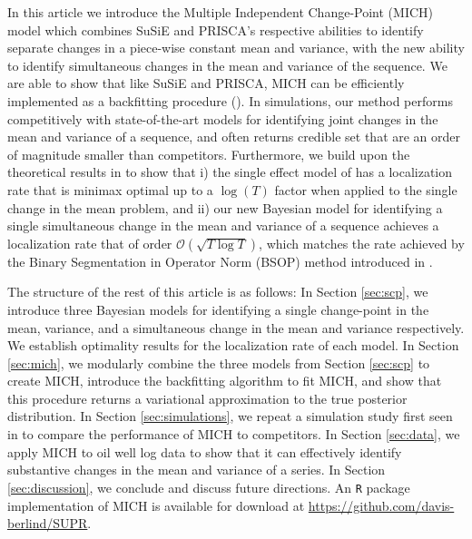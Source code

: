 In this article we introduce the Multiple Independent Change-Point (MICH) model which combines SuSiE and PRISCA's respective abilities to identify separate changes in a piece-wise constant mean and variance, with the new ability to identify simultaneous changes in the mean and variance of the sequence. We are able to show that like SuSiE and PRISCA, MICH can be efficiently implemented as a backfitting procedure (\citealp{Friedman81, Breiman85}). In simulations, our method performs competitively with state-of-the-art models for identifying joint changes in the mean and variance of a sequence, and often returns credible set that are an order of magnitude smaller than competitors. Furthermore, we build upon the theoretical results in \cite{Cappello22} to show that i) the single effect model of \cite{Wang20} has a localization rate that is minimax optimal up to a $\log(T)$ factor  when applied to the single change in the mean problem, and ii) our new Bayesian model for identifying a single simultaneous change in the mean and variance of a sequence achieves a localization rate that of order $\mathcal{O}(\sqrt{T\log T})$, which matches the rate achieved by the Binary Segmentation in Operator Norm (BSOP) method introduced in \cite{Wang21}.

The structure of the rest of this article is as follows: In Section \ref{sec:scp}, we introduce three Bayesian models for identifying a single change-point in the mean, variance, and a simultaneous change in the mean and variance respectively. We establish optimality results for the localization rate of each model. In Section \ref{sec:mich}, we modularly combine the three models from Section \ref{sec:scp} to create MICH, introduce the backfitting algorithm to fit MICH, and show that this procedure returns a variational approximation to the true posterior distribution. In Section \ref{sec:simulations}, we repeat a simulation study first seen in \cite{Pein17} to compare the performance of MICH to competitors. In Section \ref{sec:data}, we apply MICH to oil well log data to show that it can effectively identify substantive changes in the mean and variance of a series. In Section \ref{sec:discussion}, we conclude and discuss future directions. An \texttt{R} package implementation of MICH is available for download at \url{https://github.com/davis-berlind/SUPR}.
